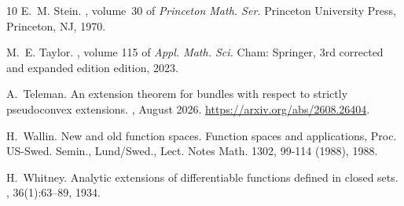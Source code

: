 \documentclass[11pt]{amsart}
\numberwithin{equation}{section}
\theoremstyle{definition}
\begin{document}
\begin{thebibliography}{10}
E.~M. Stein.
, volume~30 of {\em Princeton Math. Ser.}
\newblock Princeton University Press, Princeton, NJ, 1970.

M.~E. Taylor.
, volume 115
  of {\em Appl. Math. Sci.}
\newblock Cham: Springer, 3rd corrected and expanded edition edition, 2023.

A.~Teleman. 
\newblock An extension theorem for bundles with respect to strictly pseudoconvex extensions. 
, August 2026. 
\newblock \url{https://arxiv.org/abs/2608.26404}.

H.~Wallin.
\newblock New and old function spaces.
\newblock Function spaces and applications, {Proc}. {US}-{Swed}. {Semin}.,
  {Lund}/{Swed}., {Lect}. {Notes} {Math}. 1302, 99-114 (1988), 1988.

H.~Whitney.
\newblock Analytic extensions of differentiable functions defined in closed
  sets.
, 36(1):63--89, 1934.

\end{thebibliography}
\end{document}
